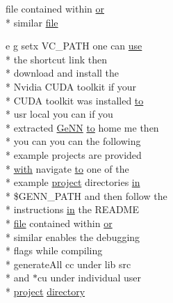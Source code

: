 \begin{DoxyCompactItemize}
file contained within \hyperlink{userproject_2PoissonIzh__project_2README_8txt_ad4021097ab0ba066271614bf3f4c2e27}{or} \\*
similar \hyperlink{README_8txt_a6f45b2930c1b79b67034355b4701dc56}{file}
\item 
e g setx V\+C\+\_\+\+P\+A\+T\+H one can \hyperlink{README_8txt_acf386c48a14a2099c9220d6bcde40fc8}{use} \\*
the shortcut link then \\*
download and install the \\*
Nvidia C\+U\+D\+A toolkit if your \\*
C\+U\+D\+A toolkit was installed \hyperlink{README_8txt_add1f2ee32acc15ef77f839d4382c9768}{to} \\*
usr local you can if you \\*
extracted \hyperlink{README_8txt_a431a8d9aae97c72793fee7c3edd68559}{Ge\+N\+N} \hyperlink{README_8txt_add1f2ee32acc15ef77f839d4382c9768}{to} home me then \\*
you can you can the following \\*
example projects are provided \\*
\hyperlink{userproject_2OneComp__project_2README_8txt_ace09bb40fbf4457ad9a9340a67a4fa9a}{with} navigate \hyperlink{README_8txt_add1f2ee32acc15ef77f839d4382c9768}{to} one of the \\*
example \hyperlink{userproject_2SynDelay__project_2README_8txt_a762c750134e07a31b7965860fd292b51}{project} directories \hyperlink{README_8txt_a148897a6b2cc9cff25af80abb13426b0}{in} \\*
\$G\+E\+N\+N\+\_\+\+P\+A\+T\+H and then follow the \\*
instructions \hyperlink{README_8txt_a148897a6b2cc9cff25af80abb13426b0}{in} the R\+E\+A\+D\+M\+E \\*
\hyperlink{README_8txt_a6f45b2930c1b79b67034355b4701dc56}{file} contained within \hyperlink{userproject_2PoissonIzh__project_2README_8txt_ad4021097ab0ba066271614bf3f4c2e27}{or} \\*
similar enables the debugging \\*
flags while compiling \\*
generate\+All cc under lib src \\*
and $\ast$cu under individual user \\*
\hyperlink{userproject_2SynDelay__project_2README_8txt_a762c750134e07a31b7965860fd292b51}{project} \hyperlink{README_8txt_ae619b68020535fba5ac79522a0d9d1c4}{directory}
\item 

\end{DoxyCompactItemize}
